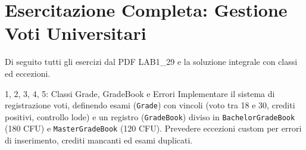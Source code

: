 \documentclass[12pt,a4paper]{article}
\begin{document}
\section{Esercitazione Completa: Gestione Voti Universitari}

Di seguito tutti gli esercizi dal PDF LAB1\_29 e la soluzione integrale con classi ed eccezioni.

\begin{exercise}{1, 2, 3, 4, 5: Classi Grade, GradeBook e Errori}
Implementare il sistema di registrazione voti, definendo esami (\texttt{Grade}) con vincoli (voto tra 18 e 30, crediti positivi, controllo lode) e un registro (\texttt{GradeBook}) diviso in \texttt{BachelorGradeBook} (180 CFU) e \texttt{MasterGradeBook} (120 CFU). Prevedere eccezioni custom per errori di inserimento, crediti mancanti ed esami duplicati.
\end{exercise}

\begin{center}
\end{center}
\end{document}

